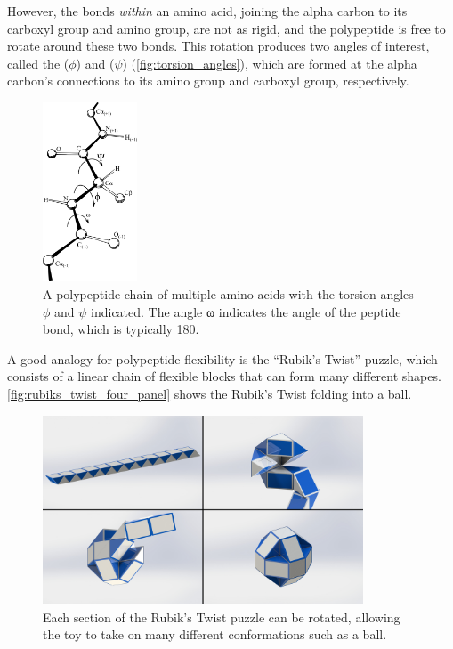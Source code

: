 However, the bonds \textit{within} an amino acid, joining the alpha carbon to its carboxyl group and amino group, are not as rigid, and the polypeptide is free to rotate around these two bonds. This rotation produces two angles of interest, called the  ($\phi$) and  ($\psi$) (\autoref{fig:torsion_angles}), which are formed at the alpha carbon's connections to its amino group and carboxyl group, respectively.

\begin{figure}[b]
	\centering
	\mySfFamily
	\includegraphics[width = 0.25\textwidth]{../images/torsion_angles.png}
	\caption{A polypeptide chain of multiple amino acids with the torsion angles $\phi$ and $\psi$ indicated. The angle ω indicates the angle of the peptide bond, which is typically 180\textdegree.}
	\label{fig:torsion_angles}
\end{figure}

A good analogy for polypeptide flexibility is the ``Rubik's Twist'' puzzle, which consists of a linear chain of flexible blocks that can form many different shapes. \autoref{fig:rubiks_twist_four_panel} shows the Rubik's Twist folding into a ball.

\begin{figure}[h]
	\centering
	\mySfFamily
	\includegraphics[width = 0.85\textwidth]{../images/rubiks_twist_four_panel.jpg}
	\caption{Each section of the Rubik's Twist puzzle can be rotated, allowing the toy to take on many different conformations such as a ball.}
	\label{fig:rubiks_twist_four_panel}
\end{figure}

